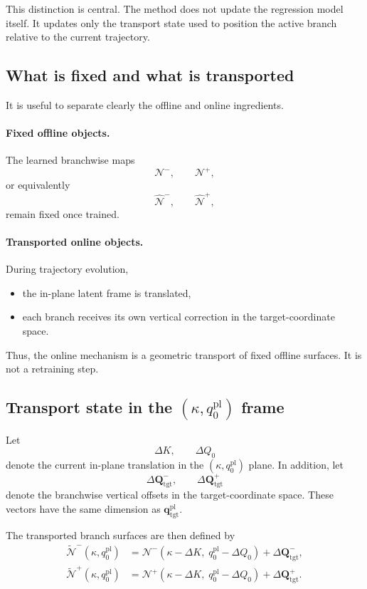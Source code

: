 \documentclass[11pt,a4paper]{article}
\begin{document}
This distinction is central. The method does not update the regression model itself. It updates only the transport state used to position the active branch relative to the current trajectory.

\subsection{What is fixed and what is transported}

It is useful to separate clearly the offline and online ingredients.

\paragraph{Fixed offline objects.}
The learned branchwise maps
\[
\mathcal{N}^{-},
\qquad
\mathcal{N}^{+},
\]
or equivalently
\[
\widehat{\mathcal{N}}^{-},
\qquad
\widehat{\mathcal{N}}^{+},
\]
remain fixed once trained.

\paragraph{Transported online objects.}
During trajectory evolution,
\begin{itemize}
\item the in-plane latent frame is translated,
\item each branch receives its own vertical correction in the target-coordinate space.
\end{itemize}

Thus, the online mechanism is a geometric transport of fixed offline surfaces. It is not a retraining step.

\subsection{Transport state in the \texorpdfstring{$(\kappa,q^{\mathrm{pl}}_0)$}{(kappa,qpl0)} frame}

Let
\[
\Delta K,
\qquad
\Delta Q_0
\]
denote the current in-plane translation in the \((\kappa,q^{\mathrm{pl}}_0)\) plane. In addition, let
\[
\Delta \mathbf{Q}_{\mathrm{tgt}}^{-},
\qquad
\Delta \mathbf{Q}_{\mathrm{tgt}}^{+}
\]
denote the branchwise vertical offsets in the target-coordinate space. These vectors have the same dimension as \(\mathbf{q}^{\mathrm{pl}}_{\mathrm{tgt}}\).

The transported branch surfaces are then defined by
\begin{align}
\widetilde{\mathcal{N}}^{-}(\kappa,q^{\mathrm{pl}}_0)
&=
\mathcal{N}^{-}(\kappa-\Delta K,\;q^{\mathrm{pl}}_0-\Delta Q_0)
+
\Delta \mathbf{Q}_{\mathrm{tgt}}^{-},
\label{eq:Nminus_transported_vector_transport_ref}
\\
\widetilde{\mathcal{N}}^{+}(\kappa,q^{\mathrm{pl}}_0)
&=
\mathcal{N}^{+}(\kappa-\Delta K,\;q^{\mathrm{pl}}_0-\Delta Q_0)
+
\Delta \mathbf{Q}_{\mathrm{tgt}}^{+}.
\label{eq:Nplus_transported_vector_transport_ref}
\end{align}
\end{document}
